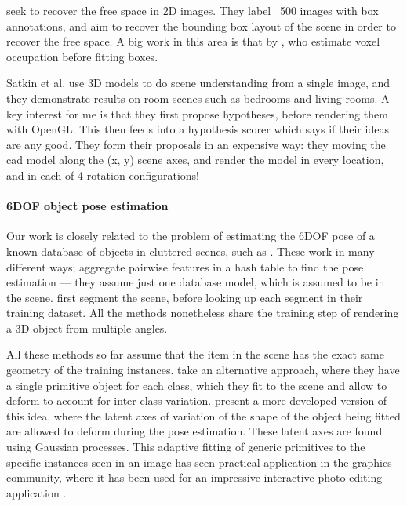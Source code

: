 \documentclass[10pt,twocolumn,letterpaper]{article}
\makeatletter
\newcommand*{\ea}{et al.\@\xspace}
\makeatother
\begin{document}
\cite{hedau-cvpr-2012} seek to recover the free space in 2D images. 
They label ~500 images with box annotations, and aim to recover the bounding box layout of the scene in order to recover the free space. 
A big work in this area is that by \cite{gupta-cvpr-2011}, who estimate voxel occupation before fitting boxes.

Satkin \ea \cite{satkin-bmvc-2012} use 3D models to do scene understanding from a single image, and they demonstrate results on room scenes such as bedrooms and living rooms. 
A key interest for me is that they first propose hypotheses, before rendering them with OpenGL.
This then feeds into a hypothesis scorer which says if their ideas are any good. 
They form their proposals in an expensive way: they moving the cad model along the (x, y) scene axes, and render the model in every location, and in each of 4 rotation configurations!

\paragraph{6DOF object pose estimation}
Our work is closely related to the problem of estimating the 6DOF pose of a known database of objects in cluttered scenes, such as \cite{hinterstoisser-accv-2012, drost-3dimpvt-2012, rusu-iros-2010}. 
These work in many different ways; \cite{drost-3dimpvt-2012} aggregate pairwise features in a hash table to find the pose estimation --- they assume just one database model, which is assumed to be in the scene. \cite{rusu-iros-2010} first segment the scene, before looking up each segment in their training dataset.
All the methods nonetheless share the training step of rendering a 3D object from multiple angles.

All these methods so far assume that the item in the scene has the exact same geometry of the training instances.
\cite{cocias-cgvcv-2013} take an alternative approach, where they have a single primitive object for each class, which they fit to the scene and allow to deform to account for inter-class variation.
\cite{prisacariu-iccv-2011} present a more developed version of this idea, where the latent axes of variation of the shape of the object being fitted are allowed to deform during the pose estimation. 
These latent axes are found using Gaussian processes.
This adaptive fitting of generic primitives to the specific instances seen in an image has seen practical application in the graphics community, where it has been used for an impressive interactive photo-editing application \cite{kholgade-siggraph-2014}.
\end{document}
